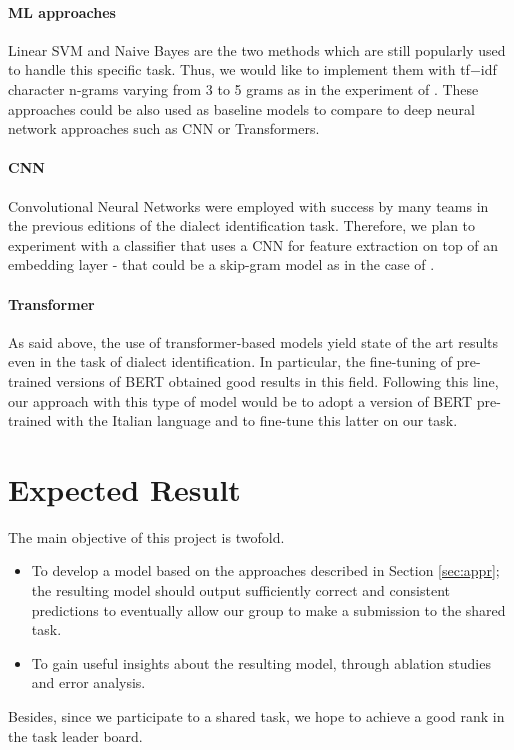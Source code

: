 \documentclass[11pt]{article}
\begin{document}
        \paragraph{ML approaches} Linear SVM and Naive Bayes are the two methods which are still popularly used to handle this specific task. Thus, we would like to implement them with tf$-$idf character n-grams varying from 3 to 5 grams as in the experiment of \cite{ceolin-2021-comparing}. These approaches could be also used as baseline models to compare to deep neural network approaches such as CNN or Transformers.
        \paragraph{CNN} %
        Convolutional Neural Networks were employed with success by many teams in the previous editions of the dialect identification task. Therefore, we plan to experiment with a classifier that uses a CNN for feature extraction on top of an embedding layer - that could be a skip-gram model \cite{10.5555/2999792.2999959} as in the case of \cite{tudoreanu-2019-dteam}.  
        
        \paragraph{Transformer} As said above, the use of transformer-based models yield state of the art results even in the task of dialect identification. In particular, the fine-tuning of pre-trained versions of BERT obtained good results in this field. Following this line, our approach with this type of model would be to adopt a version of BERT pre-trained with the Italian language \cite{PolignanoEtAlCLIC2019} and to fine-tune this latter on our task.


\section{Expected Result} %
The main objective of this project is twofold.
\begin{itemize}
    \item To develop a model based on the approaches described in Section \ref{sec:appr}; the resulting model should output sufficiently correct and consistent predictions to eventually allow our group to make a submission to the shared task.
    \item To gain useful insights about the resulting model, through ablation studies and error analysis. 
\end{itemize}
Besides, since we participate to a shared task, we hope to achieve a good rank in the task leader board.
\end{document}
